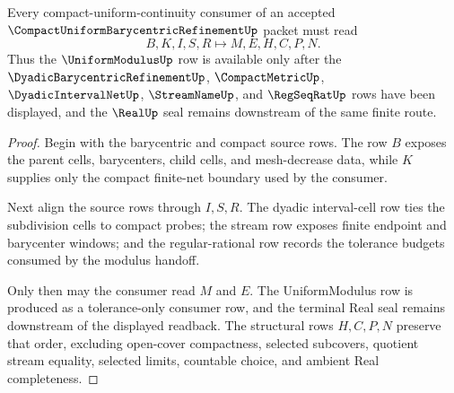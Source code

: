 \begin{theorem}\label{thm:compact-uniform-barycentric-refinement-modulus-route}
Every compact-uniform-continuity consumer of an accepted $\CompactUniformBarycentricRefinementUp$ packet must read
$$
B,K,I,S,R \longmapsto M,E,H,C,P,N .
$$
Thus the $\UniformModulusUp$ row is available only after the $\DyadicBarycentricRefinementUp$, $\CompactMetricUp$, $\DyadicIntervalNetUp$, $\StreamNameUp$, and $\RegSeqRatUp$ rows have been displayed, and the $\RealUp$ seal remains downstream of the same finite route.
\end{theorem}
\begin{proof}
Begin with the barycentric and compact source rows. The row $B$ exposes the parent cells, barycenters, child cells, and mesh-decrease data, while $K$ supplies only the compact finite-net boundary used by the consumer.

Next align the source rows through $I,S,R$. The dyadic interval-cell row ties the subdivision cells to compact probes; the stream row exposes finite endpoint and barycenter windows; and the regular-rational row records the tolerance budgets consumed by the modulus handoff.

Only then may the consumer read $M$ and $E$. The UniformModulus row is produced as a tolerance-only consumer row, and the terminal Real seal remains downstream of the displayed readback. The structural rows $H,C,P,N$ preserve that order, excluding open-cover compactness, selected subcovers, quotient stream equality, selected limits, countable choice, and ambient Real completeness.
\end{proof}


